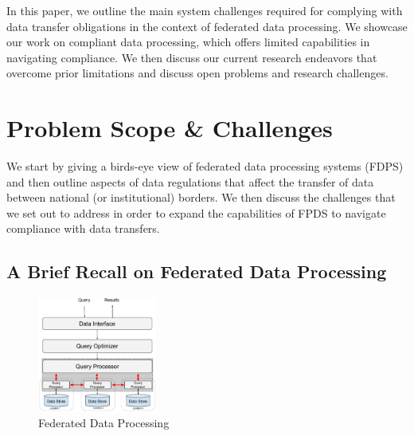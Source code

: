 \documentclass[11pt]{article}
\begin{document}
In this paper, we outline the main system challenges
required for complying with data transfer obligations in the
context of federated data processing. We showcase our work
on compliant data processing, which offers limited
capabilities in navigating compliance. We then discuss our
current research endeavors that overcome prior limitations
and discuss open problems and research challenges.



\section{Problem Scope \& Challenges} %
\label{sec:problem_scope_&_challenges}


We start by giving a birds-eye view of federated data
processing systems (FDPS) and then outline aspects of data
regulations that affect the transfer of data between
national (or institutional) borders. We then discuss the
challenges that we set out to address in order to expand the
capabilities of FPDS to navigate compliance with data
transfers.


\subsection{A Brief Recall on Federated Data Processing} %
\label{sub:overview_of_federated_data_processing}


\begin{figure}
\centering
\includegraphics[width=0.35\textwidth]{figs/fdps-overview.pdf}
\caption{Federated Data Processing}
\label{fig:fdp-overview}

\end{figure}
\end{document}
